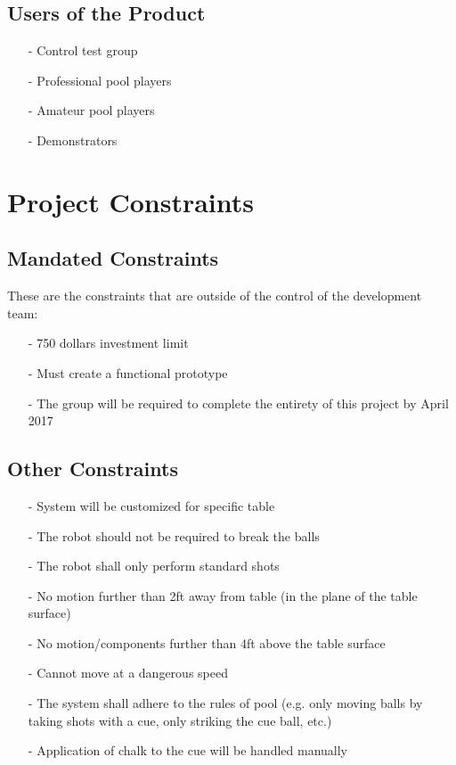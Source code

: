 \documentclass[titlepage]{article}
\begin{document}
\subsection{Users of the Product}
\begin{itemize}
	\item[-] Control test group
	\item[-] Professional pool players
	\item[-] Amateur pool players
	\item[-] Demonstrators
\end{itemize}


\section{Project Constraints}
\subsection{Mandated Constraints}%
These are the constraints that are outside of the control of the development team:
\begin{itemize}
	\item[-] 750 dollars investment limit
	\item[-] Must create a functional prototype
	\item[-] The group will be required to complete the entirety of this project by April 2017
\end{itemize}

\subsection{Other Constraints}
\begin{itemize}
	\item[-] System will be customized for specific table
	\item[-] The robot should not be required to break the balls
	\item[-] The robot shall only perform standard shots
	\item[-] No motion further than 2ft away from table (in the plane of the table surface)
	\item[-] No motion/components further than 4ft above the table surface
	\item[-] Cannot move at a dangerous speed
	\item[-] The system shall adhere to the rules of pool (e.g. only moving balls by taking shots with a cue, only striking the cue ball, etc.)
	\item[-] Application of chalk to the cue will be handled manually
\end{itemize}
\end{document}
